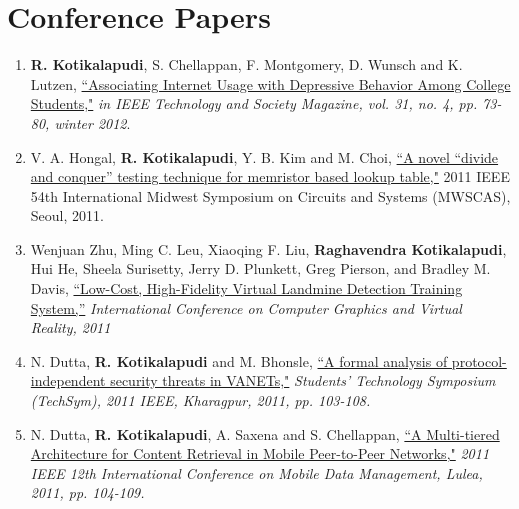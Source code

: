 \documentclass[a4paper,11pt]{article}
\begin{document}
\section{Conference Papers}
\begin{enumerate}[1)]
    \item \textbf{R. Kotikalapudi}, S. Chellappan, F. Montgomery, D. Wunsch and K. Lutzen, \href{http://ieeexplore.ieee.org/stamp/stamp.jsp?tp=&arnumber=6387969&isnumber=6387954}{``Associating Internet Usage with Depressive Behavior Among College Students,"} \emph{in IEEE Technology and Society Magazine, vol. 31, no. 4, pp. 73-80, winter 2012}.

    \item V. A. Hongal, \textbf{R. Kotikalapudi}, Y. B. Kim and M. Choi, \href{http://ieeexplore.ieee.org/xpl/articleDetails.jsp?arnumber=6026406}{``A novel ``divide and conquer'' testing technique for memristor based lookup table,"} 2011 IEEE 54th International Midwest Symposium on Circuits and Systems (MWSCAS), Seoul, 2011.  

    \item Wenjuan Zhu, Ming C. Leu, Xiaoqing F. Liu, \textbf{Raghavendra Kotikalapudi}, Hui He, Sheela Surisetty, Jerry D. Plunkett, Greg Pierson, and Bradley M. Davis, \href{http://worldcomp-proceedings.com/proc/p2011/CGV4794.pdf}{``Low-Cost, High-Fidelity Virtual Landmine Detection Training System,''} \emph{International Conference on Computer Graphics and Virtual Reality, 2011}

    \item N. Dutta, \textbf{R. Kotikalapudi} and M. Bhonsle, \href{http://ieeexplore.ieee.org/stamp/stamp.jsp?tp=&arnumber=5783810&isnumber=5783792}{``A formal analysis of protocol-independent security threats in VANETs,"} \emph{Students' Technology Symposium (TechSym), 2011 IEEE, Kharagpur, 2011, pp. 103-108.}

    \item N. Dutta, \textbf{R. Kotikalapudi}, A. Saxena and S. Chellappan, \href{http://ieeexplore.ieee.org/stamp/stamp.jsp?tp=&arnumber=6068427&isnumber=6068399}{``A Multi-tiered Architecture for Content Retrieval in Mobile Peer-to-Peer Networks,"} \emph{2011 IEEE 12th International Conference on Mobile Data Management, Lulea, 2011, pp. 104-109.}
\end{enumerate}
\end{document}
